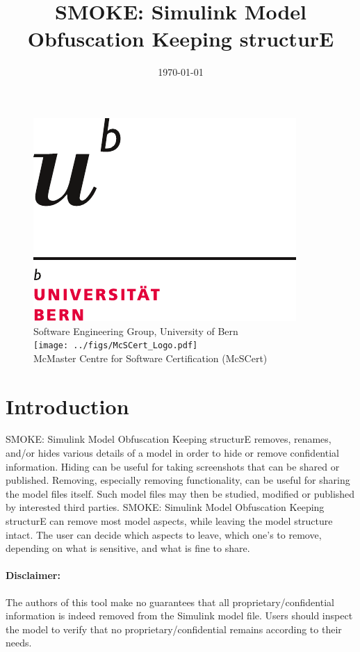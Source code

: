 \documentclass{article}
\makeatletter
\newcommand{\ToolName}{SMOKE: Simulink Model Obfuscation Keeping structurE\@\xspace}
\makeatother
\begin{document}
\title{\ToolName}
\date{\monthyeardate\today}
\maketitle
\vfill

\begin{figure}
	\centering
	\includegraphics[width=.2\textwidth]{../figs/uni_bern_logo.pdf}\\ 
	Software Engineering Group, University of Bern\\
	\texttt{[image: ../figs/McSCert\_Logo.pdf]} \\
	McMaster Centre for Software Certification (McSCert)
\end{figure}

\newpage


\tableofcontents
\newpage

\section{Introduction}

\ToolName removes, renames, and/or hides various details of a \Simulink model in order to hide or remove confidential information.
Hiding can be useful for taking screenshots that can be shared or published. Removing, especially removing functionality, can be useful
for sharing the model files itself. Such model files may then be studied, modified or published by interested third parties.
 \ToolName can remove most model aspects, while leaving the model structure intact. The user 
can decide which aspects to leave, which one's to remove, depending on what is sensitive, and what is fine to share.

\paragraph{Disclaimer:} The authors of this tool make no guarantees that all proprietary/confidential information is indeed removed from the Simulink model file. Users should inspect the model to verify that no proprietary/confidential remains according to their needs.
\end{document}
